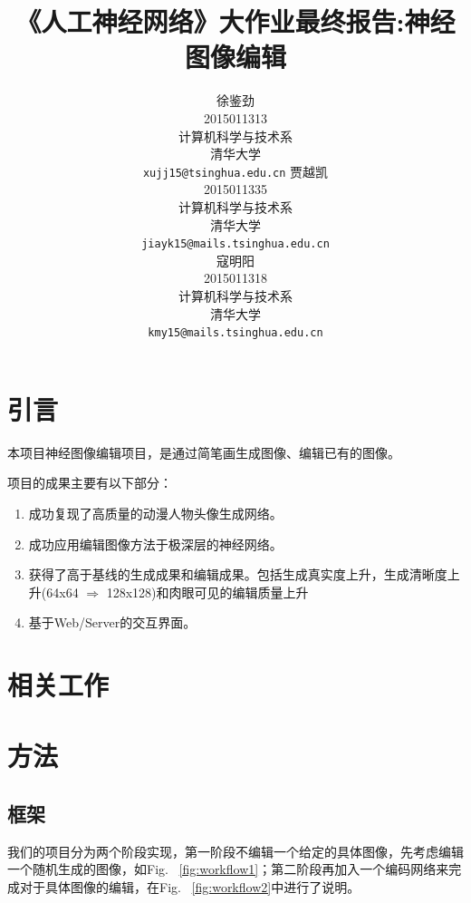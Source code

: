 \documentclass{article}
\title{《人工神经网络》大作业最终报告:神经图像编辑}
\author{
  徐鉴劲 \\
  2015011313 \\
  计算机科学与技术系 \\
  清华大学 \\
  \texttt{xujj15@tsinghua.edu.cn}
  \AND
  贾越凯 \\
  2015011335 \\
  计算机科学与技术系 \\
  清华大学 \\
  \texttt{jiayk15@mails.tsinghua.edu.cn} \\
  \AND
  寇明阳 \\
  2015011318 \\
  计算机科学与技术系 \\
  清华大学 \\
  \texttt{kmy15@mails.tsinghua.edu.cn} \\
}
\begin{document}
\maketitle

\begin{abstract}

\end{abstract}


\section{引言}

本项目神经图像编辑项目，是通过简笔画生成图像、编辑已有的图像。


项目的成果主要有以下部分：

\begin{enumerate}
\item 成功复现了高质量的动漫人物头像生成网络。
\item 成功应用编辑图像方法于极深层的神经网络。
\item 获得了高于基线的生成成果和编辑成果。包括生成真实度上升，生成清晰度上升(64x64 $\Rightarrow$ 128x128)和肉眼可见的编辑质量上升
\item 基于Web/Server的交互界面。
\end{enumerate}

\section{相关工作}


\section{方法}

\subsection{框架}

我们的项目分为两个阶段实现，第一阶段不编辑一个给定的具体图像，先考虑编辑一个随机生成的图像，如Fig. ~\ref{fig:workflow1}；第二阶段再加入一个编码网络来完成对于具体图像的编辑，在Fig. ~\ref{fig:workflow2}中进行了说明。
\end{document}
